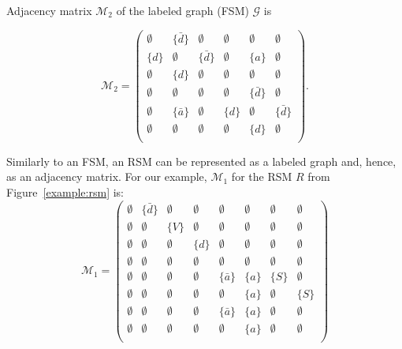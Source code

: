 Adjacency matrix $\mathcal{M}_2$ of the labeled graph (FSM) $\mathcal{G}$ is

$$
   \mathcal{M}_2 =
    \begin{pmatrix}
 \emptyset & \{\bar{d}\}  & \emptyset  &\emptyset  & \emptyset  &\emptyset     \\
 \{d\}   & \emptyset   & \{\bar{d}\}  &\emptyset  & \{a\}    &\emptyset     \\
\emptyset & \{d\}  & \emptyset  &\emptyset  & \emptyset  &\emptyset     \\
\emptyset & \emptyset & \emptyset  &\emptyset  & \{\bar{d}\}  &\emptyset     \\
\emptyset & \{\bar{a}\}  & \emptyset  &\{d\}    & \emptyset  &\{\bar{d}\}     \\
\emptyset & \emptyset & \emptyset  &\emptyset  & \{d\}   &\emptyset     \\
    \end{pmatrix}.
$$

Similarly to an FSM, an RSM can be represented as a labeled graph and, hence, as an adjacency matrix.
For our example, $\mathcal{M}_1$ for the RSM $R$ from Figure~\ref{example:rsm} is:
    $$
    \mathcal{M}_1 =
    \begin{pmatrix}
    \emptyset & \{\bar{d}\} &   \emptyset &  \emptyset & \emptyset &  \emptyset &   \emptyset &  \emptyset     \\
    \emptyset &   \emptyset & \{V\}  &  \emptyset & \emptyset & \emptyset  &   \emptyset &  \emptyset     \\
    \emptyset & \emptyset  &   \emptyset & \{d\}  & \emptyset &  \emptyset &   \emptyset &  \emptyset     \\
    \emptyset & \emptyset &   \emptyset &  \emptyset & \emptyset & \emptyset &   \emptyset &  \emptyset     \\
    \emptyset & \emptyset  &   \emptyset &  \emptyset &  \{\bar{a}\}  & \{a\} &   \{S\} &  \emptyset     \\
    \emptyset &  \emptyset  &   \emptyset &  \emptyset & \emptyset & \{a\} &   \emptyset &    \{S\}    \\
    \emptyset &  \emptyset &   \emptyset &  \emptyset &  \{\bar{a}\}  & \{a\} &   \emptyset &  \emptyset     \\
    \emptyset & \emptyset  &  \emptyset & \emptyset & \emptyset   &  \{a\}  &  \emptyset  &   \emptyset    \\
    \end{pmatrix}
    $$

